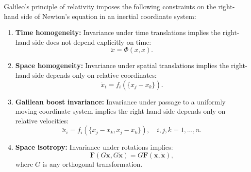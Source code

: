 Galileo's principle of relativity imposes the following constraints on the right-hand side of Newton's equation in an inertial coordinate system:

\begin{enumerate}
\item \textbf{Time homogeneity:} Invariance under time translations implies the right-hand side does not depend explicitly on time:
$$\ddot{x} = \Phi(x, \dot{x}).$$

\item \textbf{Space homogeneity:} Invariance under spatial translations implies the right-hand side depends only on relative coordinates:
$$\ddot{x}_i = f_i(\{x_j - x_k\}).$$

\item \textbf{Galilean boost invariance:} Invariance under passage to a uniformly moving coordinate system implies the right-hand side depends only on relative velocities:
$$\ddot{x}_i = f_i(\{x_j - x_k, \dot{x}_j - \dot{x}_k\}), \quad i, j, k = 1, \ldots, n.$$

\item \textbf{Space isotropy:} Invariance under rotations implies:
$$\mathbf{F}(G\mathbf{x}, G\dot{\mathbf{x}}) = G\mathbf{F}(\mathbf{x}, \dot{\mathbf{x}}),$$
where $G$ is any orthogonal transformation.
\end{enumerate}
